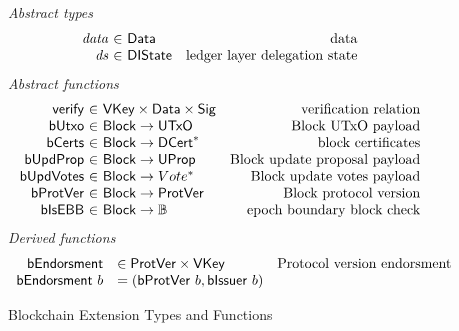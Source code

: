 \documentclass[11pt,a4paper]{article}
\newcommand{\var}[1]{\mathit{#1}}
\newcommand{\fun}[1]{\mathsf{#1}}
\newcommand{\type}[1]{\mathsf{#1}}
\newcommand{\seqof}[1]{#1^{*}}
\newcommand{\totalf}{\to}
\newcommand{\Block}{\type{Block}}
\newcommand{\DCert}{\type{DCert}}
\newcommand{\VKey}{\type{VKey}}
\newcommand{\Sig}{\type{Sig}}
\newcommand{\Data}{\type{Data}}
\newcommand{\DelegState}{\type{DIState}}
\newcommand{\verifyname}{verify}
\newcommand{\isebbname}{bIsEBB}
\newcommand{\bcertsname}{bCerts}
\newcommand{\bissuername}{bIssuer}
\newcommand{\bissuer}[1]{\fun{\bissuername} ~ #1}
\begin{document}
\newcommand{\UPIEnv}{\type{UPIEnv}}
\newcommand{\UPIState}{\type{UPIState}}
\newcommand{\UProp}{\type{UProp}}
\newcommand{\Vote}{\ensuremath{\type{Vote}}}
\newcommand{\ProtVer}{\ensuremath{\type{ProtVer}}}

\begin{figure}[ht]
  \emph{Abstract types}
  \begin{equation*}
  \begin{array}{r@{~\in~}lr}
    \var{data} & \Data    & \text{data}\\
    \var{ds} & \DelegState & \text{ledger layer delegation state}
  \end{array}
  \end{equation*}
  \emph{Abstract functions}
  \begin{equation*}
  \begin{array}{r@{~\in~}lr}
    \fun{\verifyname} & \VKey \times \Data \times \Sig
      & \text{verification relation} \\
    \fun{bUtxo} & \Block \totalf \UTxO & \text{Block UTxO payload} \\
    \fun{\bcertsname} & \Block \totalf \seqof{\DCert}
      & \text{block certificates} \\
    \fun{bUpdProp} & \Block \totalf \UProp & \text{Block update proposal payload} \\
    \fun{bUpdVotes} & \Block \totalf \seqof{Vote} & \text{Block update votes payload} \\
    \fun{bProtVer} & \Block \totalf \ProtVer & \text{Block protocol version} \\
    \fun{\isebbname} & \Block \totalf \mathbb{B} & \text{epoch boundary block check} \\
  \end{array}
  \end{equation*}
  \emph{Derived functions}
  \begin{equation*}
    \begin{array}{rlr}
      \fun{bEndorsment} & \in \ProtVer \times \VKey & \text{Protocol version endorsment} \\
      \bendorsment{b} & = (\bprotver{b}, \bissuer{b})
    \end{array}
  \end{equation*}

  \caption{Blockchain Extension Types and Functions}
  \label{fig:defs:chain-extension}
\end{figure}
\end{document}
